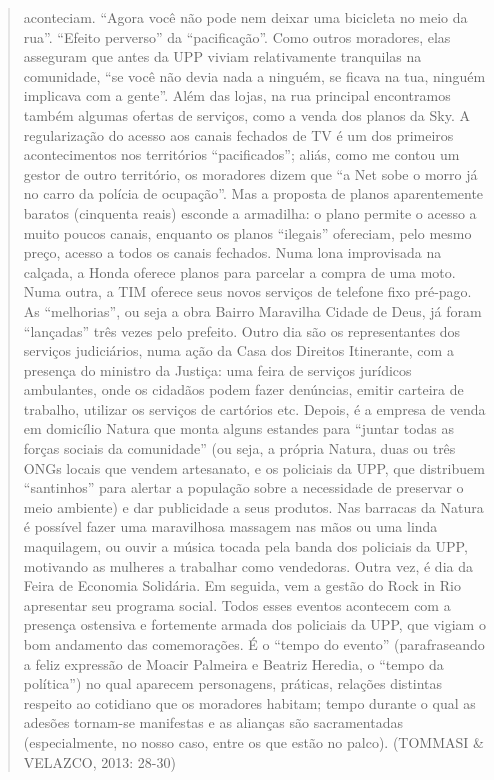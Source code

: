 \begin{quote}
aconteciam. ``Agora você não pode nem deixar uma bicicleta no meio da
rua''. ``Efeito perverso'' da ``pacificação''. Como outros moradores,
elas asseguram que antes da UPP viviam relativamente tranquilas na
comunidade, ``se você não devia nada a ninguém, se ficava na tua,
ninguém implicava com a gente''. Além das lojas, na rua principal
encontramos também algumas ofertas de serviços, como a venda dos planos
da Sky. A regularização do acesso aos canais fechados de TV é um dos
primeiros acontecimentos nos territórios ``pacificados''; aliás, como me
contou um gestor de outro território, os moradores dizem que ``a Net
sobe o morro já no carro da polícia de ocupação''. Mas a proposta de
planos aparentemente baratos (cinquenta reais) esconde a armadilha: o
plano permite o acesso a muito poucos canais, enquanto os planos
``ilegais'' ofereciam, pelo mesmo preço, acesso a todos os canais
fechados. Numa lona improvisada na calçada, a Honda oferece planos para
parcelar a compra de uma moto. Numa outra, a TIM oferece seus novos
serviços de telefone fixo pré-pago. As ``melhorias'', ou seja a obra
Bairro Maravilha Cidade de Deus, já foram ``lançadas'' três vezes pelo
prefeito. Outro dia são os representantes dos serviços judiciários, numa
ação da Casa dos Direitos Itinerante, com a presença do ministro da
Justiça: uma feira de serviços jurídicos ambulantes, onde os cidadãos
podem fazer denúncias, emitir carteira de trabalho, utilizar os serviços
de cartórios etc. Depois, é a empresa de venda em domicílio Natura que
monta alguns estandes para ``juntar todas as forças sociais da
comunidade'' (ou seja, a própria Natura, duas ou três ONGs locais que
vendem artesanato, e os policiais da UPP, que distribuem ``santinhos''
para alertar a população sobre a necessidade de preservar o meio
ambiente) e dar publicidade a seus produtos. Nas barracas da Natura é
possível fazer uma maravilhosa massagem nas mãos ou uma linda
maquilagem, ou ouvir a música tocada pela banda dos policiais da UPP,
motivando as mulheres a trabalhar como vendedoras. Outra vez, é dia da
Feira de Economia Solidária. Em seguida, vem a gestão do Rock in Rio
apresentar seu programa social. Todos esses eventos acontecem com a
presença ostensiva e fortemente armada dos policiais da UPP, que vigiam
o bom andamento das comemorações. É o ``tempo do evento'' (parafraseando
a feliz expressão de Moacir Palmeira e Beatriz Heredia, o ``tempo da
política'') no qual aparecem personagens, práticas, relações distintas
respeito ao cotidiano que os moradores habitam; tempo durante o qual as
adesões tornam-se manifestas e as alianças são sacramentadas
(especialmente, no nosso caso, entre os que estão no palco). (TOMMASI \&
VELAZCO, 2013: 28-30)
\end{quote}

